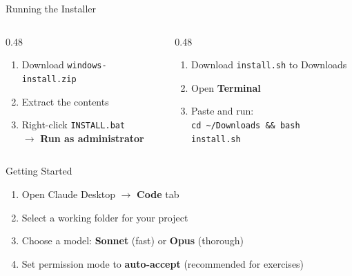 \documentclass[aspectratio=169]{beamer}
\begin{document}
\begin{frame}{Running the Installer}
\begin{columns}[T]
\begin{column}{0.48\textwidth}
\begin{shadedbox}[title=\textbf{Windows}]
\begin{enumerate}\small
  \item Download \texttt{windows-install.zip}
  \item Extract the contents
  \item Right-click \texttt{INSTALL.bat}\\$\rightarrow$ \textbf{Run as administrator}
\end{enumerate}
\end{shadedbox}
\end{column}
\begin{column}{0.48\textwidth}
\begin{shadedbox}[title=\textbf{Mac}]
\begin{enumerate}\small
  \item Download \texttt{install.sh} to Downloads
  \item Open \textbf{Terminal}
  \item Paste and run:\\[2pt]
    \texttt{\footnotesize cd \textasciitilde/Downloads \&\& bash install.sh}
\end{enumerate}
\end{shadedbox}
\end{column}
\end{columns}
\end{frame}

\begin{frame}{Getting Started}
\begin{enumerate}
  \item Open Claude Desktop $\rightarrow$ \textbf{Code} tab
  \item Select a working folder for your project
  \item Choose a model: \textbf{Sonnet} (fast) or \textbf{Opus} (thorough)
  \item Set permission mode to \textbf{auto-accept} (recommended for exercises)
\end{enumerate}
\end{frame}
\end{document}
